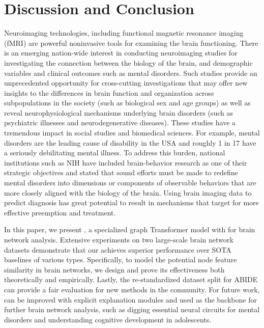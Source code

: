 \section{Discussion and Conclusion}
\label{sec:conclusion}
Neuroimaging technologies, including functional magnetic resonance imaging (fMRI) are powerful noninvasive tools for examining the brain functioning. There is an emerging nation-wide interest in conducting neuroimaging studies for investigating the connection between the biology of the brain, and demographic variables and clinical outcomes such as mental disorders. Such studies provide an unprecedented opportunity for cross-cutting investigations that may offer new insights to the differences in brain function and organization across subpopulations in the society (such as biological sex and age groups) as well as reveal neurophysiological mechanisms underlying brain disorders (such as psychiatric illnesses and neurodegenerative diseases). These studies have a tremendous impact in social studies and biomedical sciences. For example, mental disorders are the leading cause of disability in the USA and roughly 1 in 17 have a seriously debilitating mental illness. To address this burden, national institutions such as NIH have included brain-behavior research as one of their strategic objectives and stated that sound efforts must be made to redefine mental disorders into dimensions or components of observable behaviors that are more closely aligned with the biology of the brain. Using brain imaging data to predict diagnosis has great potential to result in mechanisms that target for more effective preemption and treatment.

In this paper, we present \methodfull, a specialized graph Transformer model with \pooling for brain network analysis. Extensive experiments on two large-scale brain network datasets demonstrate that our \methodtable achieves superior performance over SOTA baselines of various types. Specifically, to model the potential node feature similarity in brain networks, we design \poolingshort and prove its effectiveness both theoretically and empirically. Lastly, the re-standardized dataset split for ABIDE can provide a fair evaluation for new methods in the community. For future work, \methodtable can be improved with explicit explanation modules and used as the backbone for further brain network analysis, such as digging essential neural circuits for mental disorders and understanding cognitive development in adolescents.

